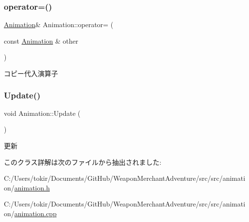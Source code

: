 \subsubsection{\texorpdfstring{operator=()}{operator=()}}
{\footnotesize\ttfamily \mbox{\hyperlink{class_animation}{Animation}}\& Animation\+::operator= (\begin{DoxyParamCaption}\item[{const \mbox{\hyperlink{class_animation}{Animation}} \&}]{other }\end{DoxyParamCaption})\hspace{0.3cm}{\ttfamily [inline]}}



コピー代入演算子 

\mbox{\label{class_animation_a0c6a4e940db84d4a6246fcb3ae773402}} 
\subsubsection{\texorpdfstring{Update()}{Update()}}
{\footnotesize\ttfamily void Animation\+::\+Update (\begin{DoxyParamCaption}{ }\end{DoxyParamCaption})}



更新 



このクラス詳解は次のファイルから抽出されました\+:\begin{DoxyCompactItemize}
\item 
C\+:/\+Users/tokir/\+Documents/\+Git\+Hub/\+Weapon\+Merchant\+Adventure/src/src/animation/\mbox{\hyperlink{animation_8h}{animation.\+h}}\item 
C\+:/\+Users/tokir/\+Documents/\+Git\+Hub/\+Weapon\+Merchant\+Adventure/src/src/animation/\mbox{\hyperlink{animation_8cpp}{animation.\+cpp}}\end{DoxyCompactItemize}

